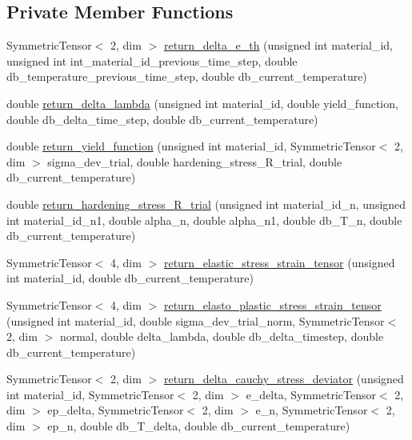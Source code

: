 \subsection*{Private Member Functions}
\begin{DoxyCompactItemize}
\item 
Symmetric\+Tensor$<$ 2, dim $>$ \hyperlink{classConstitutive__Laws_1_1Thermo__Elasto__Plastic_aa0d53eb09b8f27ade4b504ba92c67a73}{return\+\_\+delta\+\_\+e\+\_\+th} (unsigned int material\+\_\+id, unsigned int int\+\_\+material\+\_\+id\+\_\+previous\+\_\+time\+\_\+step, double db\+\_\+temperature\+\_\+previous\+\_\+time\+\_\+step, double db\+\_\+current\+\_\+temperature)
\item 
double \hyperlink{classConstitutive__Laws_1_1Thermo__Elasto__Plastic_a807382a573b93d6c0f2c3aa14ad5b6ac}{return\+\_\+delta\+\_\+lambda} (unsigned int material\+\_\+id, double yield\+\_\+function, double db\+\_\+delta\+\_\+time\+\_\+step, double db\+\_\+current\+\_\+temperature)
\item 
double \hyperlink{classConstitutive__Laws_1_1Thermo__Elasto__Plastic_ae5bc0affd62bea77637f34f641047831}{return\+\_\+yield\+\_\+function} (unsigned int material\+\_\+id, Symmetric\+Tensor$<$ 2, dim $>$ sigma\+\_\+dev\+\_\+trial, double hardening\+\_\+stress\+\_\+\+R\+\_\+trial, double db\+\_\+current\+\_\+temperature)
\item 
double \hyperlink{classConstitutive__Laws_1_1Thermo__Elasto__Plastic_aac67a72f1a65a55f2b155aabb9def3c5}{return\+\_\+hardening\+\_\+stress\+\_\+\+R\+\_\+trial} (unsigned int material\+\_\+id\+\_\+n, unsigned int material\+\_\+id\+\_\+n1, double alpha\+\_\+n, double alpha\+\_\+n1, double db\+\_\+\+T\+\_\+n, double db\+\_\+current\+\_\+temperature)
\item 
Symmetric\+Tensor$<$ 4, dim $>$ \hyperlink{classConstitutive__Laws_1_1Thermo__Elasto__Plastic_ae4b06b02caf03b89ed12254f8e7da816}{return\+\_\+elastic\+\_\+stress\+\_\+strain\+\_\+tensor} (unsigned int material\+\_\+id, double db\+\_\+current\+\_\+temperature)
\item 
Symmetric\+Tensor$<$ 4, dim $>$ \hyperlink{classConstitutive__Laws_1_1Thermo__Elasto__Plastic_a3c565ecee2f2db0511877f2b20302b14}{return\+\_\+elasto\+\_\+plastic\+\_\+stress\+\_\+strain\+\_\+tensor} (unsigned int material\+\_\+id, double sigma\+\_\+dev\+\_\+trial\+\_\+norm, Symmetric\+Tensor$<$ 2, dim $>$ normal, double delta\+\_\+lambda, double db\+\_\+delta\+\_\+timestep, double db\+\_\+current\+\_\+temperature)
\item 
Symmetric\+Tensor$<$ 2, dim $>$ \hyperlink{classConstitutive__Laws_1_1Thermo__Elasto__Plastic_af1cc15583d72208ac71ef846769744ca}{return\+\_\+delta\+\_\+cauchy\+\_\+stress\+\_\+deviator} (unsigned int material\+\_\+id, Symmetric\+Tensor$<$ 2, dim $>$ e\+\_\+delta, Symmetric\+Tensor$<$ 2, dim $>$ ep\+\_\+delta, Symmetric\+Tensor$<$ 2, dim $>$ e\+\_\+n, Symmetric\+Tensor$<$ 2, dim $>$ ep\+\_\+n, double db\+\_\+\+T\+\_\+delta, double db\+\_\+current\+\_\+temperature)

\end{DoxyCompactItemize}
